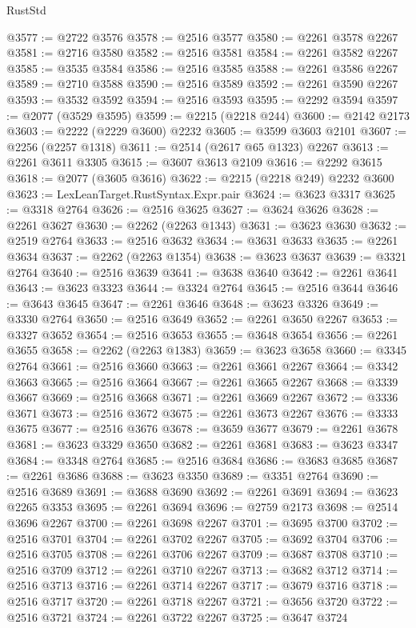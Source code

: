 \begin{lexlean}{RustStd}
\begin{coremodule}
@3577 := @2722 @3576
@3578 := @2516 @3577
@3580 := @2261 @3578 @2267
@3581 := @2716 @3580
@3582 := @2516 @3581
@3584 := @2261 @3582 @2267
@3585 := @3535 @3584
@3586 := @2516 @3585
@3588 := @2261 @3586 @2267
@3589 := @2710 @3588
@3590 := @2516 @3589
@3592 := @2261 @3590 @2267
@3593 := @3532 @3592
@3594 := @2516 @3593
@3595 := @2292 @3594
@3597 := @2077 (@3529 @3595)
@3599 := @2215 (@2218 @244)
@3600 := @2142 @2173
@3603 := @2222 (@2229 @3600) @2232
@3605 := @3599 @3603 @2101
@3607 := @2256 (@2257 @1318)
@3611 := @2514 (@2617 @65 @1323) @2267
@3613 := @2261 @3611 @3305
@3615 := @3607 @3613 @2109
@3616 := @2292 @3615
@3618 := @2077 (@3605 @3616)
@3622 := @2215 (@2218 @249) @2232 @3600
@3623 := LexLeanTarget.RustSyntax.Expr.pair
@3624 := @3623 @3317
@3625 := @3318 @2764
@3626 := @2516 @3625
@3627 := @3624 @3626
@3628 := @2261 @3627
@3630 := @2262 (@2263 @1343)
@3631 := @3623 @3630
@3632 := @2519 @2764
@3633 := @2516 @3632
@3634 := @3631 @3633
@3635 := @2261 @3634
@3637 := @2262 (@2263 @1354)
@3638 := @3623 @3637
@3639 := @3321 @2764
@3640 := @2516 @3639
@3641 := @3638 @3640
@3642 := @2261 @3641
@3643 := @3623 @3323
@3644 := @3324 @2764
@3645 := @2516 @3644
@3646 := @3643 @3645
@3647 := @2261 @3646
@3648 := @3623 @3326
@3649 := @3330 @2764
@3650 := @2516 @3649
@3652 := @2261 @3650 @2267
@3653 := @3327 @3652
@3654 := @2516 @3653
@3655 := @3648 @3654
@3656 := @2261 @3655
@3658 := @2262 (@2263 @1383)
@3659 := @3623 @3658
@3660 := @3345 @2764
@3661 := @2516 @3660
@3663 := @2261 @3661 @2267
@3664 := @3342 @3663
@3665 := @2516 @3664
@3667 := @2261 @3665 @2267
@3668 := @3339 @3667
@3669 := @2516 @3668
@3671 := @2261 @3669 @2267
@3672 := @3336 @3671
@3673 := @2516 @3672
@3675 := @2261 @3673 @2267
@3676 := @3333 @3675
@3677 := @2516 @3676
@3678 := @3659 @3677
@3679 := @2261 @3678
@3681 := @3623 @3329 @3650
@3682 := @2261 @3681
@3683 := @3623 @3347
@3684 := @3348 @2764
@3685 := @2516 @3684
@3686 := @3683 @3685
@3687 := @2261 @3686
@3688 := @3623 @3350
@3689 := @3351 @2764
@3690 := @2516 @3689
@3691 := @3688 @3690
@3692 := @2261 @3691
@3694 := @3623 @2265 @3353
@3695 := @2261 @3694
@3696 := @2759 @2173
@3698 := @2514 @3696 @2267
@3700 := @2261 @3698 @2267
@3701 := @3695 @3700
@3702 := @2516 @3701
@3704 := @2261 @3702 @2267
@3705 := @3692 @3704
@3706 := @2516 @3705
@3708 := @2261 @3706 @2267
@3709 := @3687 @3708
@3710 := @2516 @3709
@3712 := @2261 @3710 @2267
@3713 := @3682 @3712
@3714 := @2516 @3713
@3716 := @2261 @3714 @2267
@3717 := @3679 @3716
@3718 := @2516 @3717
@3720 := @2261 @3718 @2267
@3721 := @3656 @3720
@3722 := @2516 @3721
@3724 := @2261 @3722 @2267
@3725 := @3647 @3724

\end{coremodule}
\end{lexlean}
